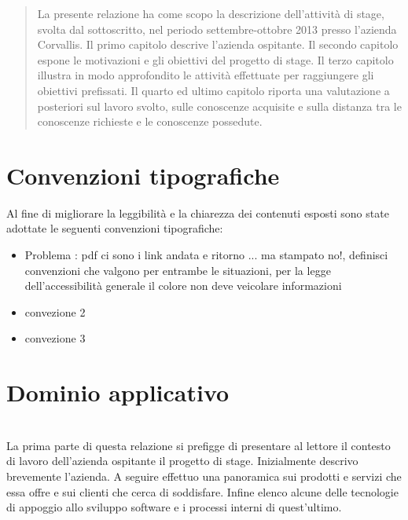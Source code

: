 \newcommand{\Versione}{1.0}%
\newcommand{\Data}{2013-01-21}%




\null\vspace{2.0in}
\begin{abstract}
La presente relazione ha come scopo la descrizione dell'attività di stage, svolta dal sottoscritto, nel periodo settembre-ottobre 2013 presso l'azienda Corvallis. Il primo capitolo descrive l'azienda ospitante. Il secondo capitolo espone le motivazioni e gli obiettivi del progetto di stage. Il terzo capitolo illustra in modo approfondito le attività effettuate per raggiungere gli obiettivi prefissati. Il quarto ed ultimo capitolo riporta una valutazione a posteriori sul lavoro svolto, sulle conoscenze acquisite e sulla distanza tra le conoscenze richieste e le conoscenze possedute.
\end{abstract}
\vspace{\fill}
%
\newpage
\section*{Convenzioni tipografiche}
Al fine di migliorare la leggibilità e la chiarezza dei contenuti esposti sono state adottate le seguenti convenzioni tipografiche:
\begin{itemize}
\item Problema : pdf ci sono i link andata e ritorno ... ma stampato no!, definisci convenzioni che valgono per entrambe le situazioni, per la legge dell'accessibilità generale il colore non deve veicolare informazioni
\item convezione 2
\item convezione 3
\end{itemize}

\newpage
\tableofcontents

\newpage

\listoftables
\listoffigures

\newpage

\section{Dominio applicativo}\\
\label{1.0}
La prima parte di questa relazione si prefigge di presentare al lettore il contesto di lavoro dell'azienda ospitante il progetto di stage. Inizialmente descrivo brevemente l'azienda. A seguire effettuo una panoramica sui prodotti e servizi che essa offre e sui clienti che cerca di soddisfare. Infine elenco alcune delle tecnologie di appoggio allo sviluppo software e i processi interni di quest'ultimo.

